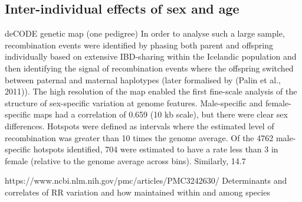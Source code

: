 


\subsection{Inter-individual effects of sex and age}

deCODE genetic map (one pedigree)
In order to analyse such a large sample, recombination events were identified by phasing both parent and offspring individually based on extensive IBD-sharing within the Icelandic population and then identifying the signal of recombination events where the offspring switched between paternal and maternal haplotypes (later formalised by (Palin et al., 2011)). 
The high resolution of the map enabled the first fine-scale analysis of the structure of sex-specific variation at genome features. 
Male-specific and female-specific maps had a correlation of 0.659 (10 kb scale), but there were clear sex differences. Hotspots were defined as intervals where the estimated level of recombination was greater than 10 times the genome average. Of the 4762 male-specific hotspots identified, 704 were estimated to have a rate less than 3 in female (relative to the genome average across bins). Similarly, 14.7%



https://www.ncbi.nlm.nih.gov/pmc/articles/PMC3242630/
Determinants and correlates of RR variation and how maintained within and among species


